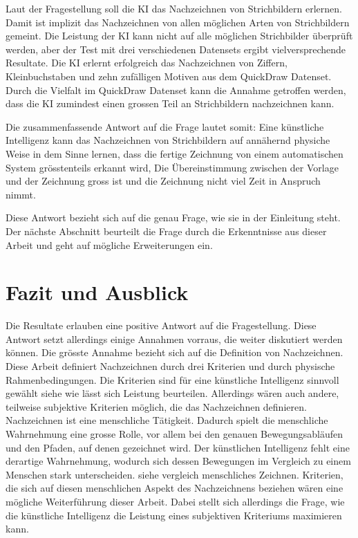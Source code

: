 {Laut der Fragestellung soll die KI das Nachzeichnen von Strichbildern erlernen.
Damit ist implizit das Nachzeichnen von allen möglichen Arten von Strichbildern
gemeint. Die Leistung der KI kann nicht auf alle möglichen Strichbilder
überprüft werden, aber der Test mit drei verschiedenen Datensets ergibt
vielversprechende Resultate. Die KI erlernt erfolgreich das Nachzeichnen von
Ziffern, Kleinbuchstaben und zehn zufälligen Motiven aus dem QuickDraw Datenset.
Durch die Vielfalt im QuickDraw Datenset kann die Annahme getroffen werden, dass
die KI zumindest einen grossen Teil an Strichbildern nachzeichnen kann. 

Die zusammenfassende Antwort auf die Frage lautet somit: Eine künstliche
Intelligenz kann das Nachzeichnen von Strichbildern auf annähernd physiche Weise
in dem Sinne lernen, dass die fertige Zeichnung von einem automatischen System
grösstenteils erkannt wird, Die Übereinstimmung zwischen der Vorlage und der
Zeichnung gross ist und die Zeichnung nicht viel Zeit in Anspruch nimmt.

Diese Antwort bezieht sich auf die genau Frage, wie sie in der Einleitung steht.
Der nächste Abschnitt beurteilt die Frage durch die Erkenntnisse aus dieser
Arbeit und geht auf mögliche Erweiterungen ein.



\section{Fazit und Ausblick}
\label{chap:d_faz-aus}
Die Resultate erlauben eine positive Antwort auf die Fragestellung. Diese
Antwort setzt allerdings einige Annahmen vorraus, die weiter diskutiert werden
können. Die grösste Annahme bezieht sich auf die Definition von Nachzeichnen.
Diese Arbeit definiert Nachzeichnen durch drei Kriterien und durch physische
Rahmenbedingungen. Die Kriterien sind für eine künstliche Intelligenz sinnvoll
gewählt {siehe wie lässt sich Leistung beurteilen}. Allerdings wären auch
andere, teilweise subjektive Kriterien möglich, die das Nachzeichnen definieren.
Nachzeichnen ist eine menschliche Tätigkeit. Dadurch spielt die menschliche
Wahrnehmung eine grosse Rolle, vor allem bei den genauen Bewegungsabläufen und
den Pfaden, auf denen gezeichnet wird. Der künstlichen Intelligenz fehlt eine
derartige Wahrnehmung, wodurch sich dessen Bewegungen im Vergleich zu einem
Menschen stark unterscheiden. {siehe vergleich menschliches Zeichnen}.
Kriterien, die sich auf diesen menschlichen Aspekt des Nachzeichnens beziehen
wären eine mögliche Weiterführung dieser Arbeit. Dabei stellt sich allerdings
die Frage, wie die künstliche Intelligenz die Leistung eines subjektiven
Kriteriums maximieren kann.

}
